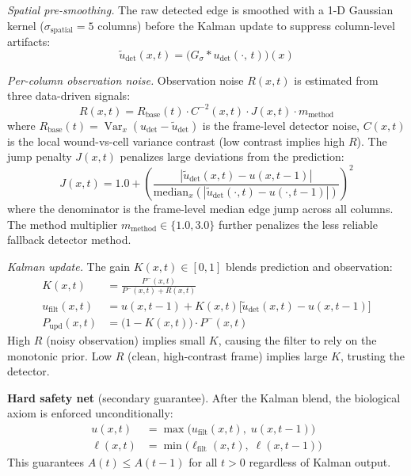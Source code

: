 \emph{Spatial pre-smoothing.}
The raw detected edge is smoothed with a 1-D Gaussian kernel ($\sigma_\text{spatial} = 5$
columns) before the Kalman update to suppress column-level artifacts:
\begin{equation}
	\tilde{u}_\text{det}(x, t) = \bigl(G_{\sigma} * u_\text{det}(\cdot,\, t)\bigr)(x)
	\label{eq:spatial-smooth}
\end{equation}

\emph{Per-column observation noise.}
Observation noise $R(x, t)$ is estimated from three data-driven signals:
\begin{equation}
	R(x, t) = R_\text{base}(t) \cdot C^{-2}(x, t) \cdot J(x, t) \cdot m_\text{method}
	\label{eq:R-estimate}
\end{equation}
where $R_\text{base}(t) = \operatorname{Var}_{x}(u_\text{det} - \tilde{u}_\text{det})$
is the frame-level detector noise, $C(x,t)$ is the local wound-vs-cell variance contrast
(low contrast implies high $R$). The jump penalty $J(x,t)$ penalizes large deviations from the prediction:
\begin{equation}
	J(x, t) = 1.0 + \left(\frac{|\tilde{u}_\text{det}(x,t) - u(x,t-1)|}{\text{median}_x(|\tilde{u}_\text{det}(\cdot,t) - u(\cdot,t-1)|)}\right)^2
	\label{eq:jump-factor}
\end{equation}
where the denominator is the frame-level median edge jump across all columns. The method multiplier $m_\text{method} \in \{1.0, 3.0\}$ further penalizes the less reliable fallback detector method.

\emph{Kalman update.}
The gain $K(x,t) \in [0, 1]$ blends prediction and observation:
\begin{align}
	K(x, t) &= \frac{P^-(x, t)}{P^-(x, t) + R(x, t)} \label{eq:kalman-gain} \\
	u_\text{filt}(x, t) &= u(x, t-1) + K(x, t)\bigl[\tilde{u}_\text{det}(x, t) - u(x, t-1)\bigr] \label{eq:kalman-update} \\
	P_\text{upd}(x, t) &= \bigl(1 - K(x, t)\bigr) \cdot P^-(x, t) \label{eq:P-update}
\end{align}
High $R$ (noisy observation) implies small $K$, causing the filter to rely on the monotonic
prior.
Low $R$ (clean, high-contrast frame) implies large $K$, trusting the detector.

\textbf{Hard safety net} (secondary guarantee).
After the Kalman blend, the biological axiom is enforced unconditionally:
\begin{align}
	u(x, t) &= \max\!\bigl(u_\text{filt}(x, t),\; u(x, t-1)\bigr) \label{eq:hard-upper} \\
	\ell(x, t) &= \min\!\bigl(\ell_\text{filt}(x, t),\; \ell(x, t-1)\bigr) \label{eq:hard-lower}
\end{align}
This guarantees $A(t) \leq A(t-1)$ for all $t > 0$ regardless of Kalman output.

